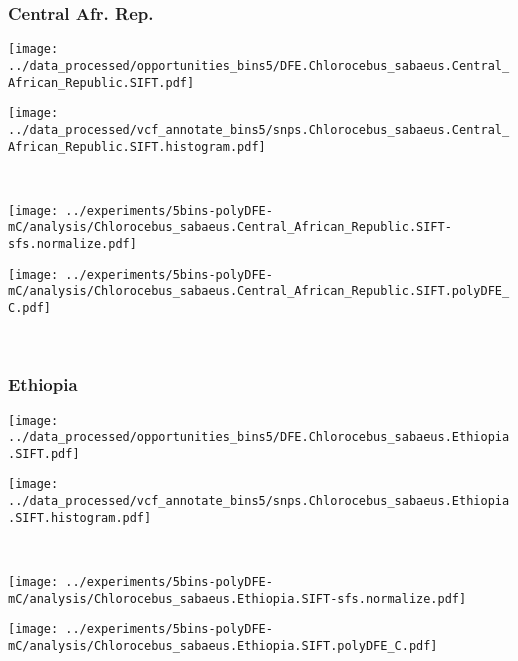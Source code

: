 \subsubsection{Central Afr. Rep.}

\begin{minipage}{0.49\linewidth}
    \texttt{[image: ../data\_processed/opportunities\_bins5/DFE.Chlorocebus\_sabaeus.Central\_African\_Republic.SIFT.pdf]}
\end{minipage}
\begin{minipage}{0.49\linewidth}
    \texttt{[image: ../data\_processed/vcf\_annotate\_bins5/snps.Chlorocebus\_sabaeus.Central\_African\_Republic.SIFT.histogram.pdf]}
\end{minipage}
\\
\begin{minipage}{0.49\linewidth}
    \texttt{[image: ../experiments/5bins-polyDFE-mC/analysis/Chlorocebus\_sabaeus.Central\_African\_Republic.SIFT-sfs.normalize.pdf]}
\end{minipage}
\begin{minipage}{0.49\linewidth}
    \texttt{[image: ../experiments/5bins-polyDFE-mC/analysis/Chlorocebus\_sabaeus.Central\_African\_Republic.SIFT.polyDFE\_C.pdf]}
\end{minipage}
\\

\subsubsection{Ethiopia}

\begin{minipage}{0.49\linewidth}
    \texttt{[image: ../data\_processed/opportunities\_bins5/DFE.Chlorocebus\_sabaeus.Ethiopia.SIFT.pdf]}
\end{minipage}
\begin{minipage}{0.49\linewidth}
    \texttt{[image: ../data\_processed/vcf\_annotate\_bins5/snps.Chlorocebus\_sabaeus.Ethiopia.SIFT.histogram.pdf]}
\end{minipage}
\\
\begin{minipage}{0.49\linewidth}
    \texttt{[image: ../experiments/5bins-polyDFE-mC/analysis/Chlorocebus\_sabaeus.Ethiopia.SIFT-sfs.normalize.pdf]}
\end{minipage}
\begin{minipage}{0.49\linewidth}
    \texttt{[image: ../experiments/5bins-polyDFE-mC/analysis/Chlorocebus\_sabaeus.Ethiopia.SIFT.polyDFE\_C.pdf]}
\end{minipage}
\\

